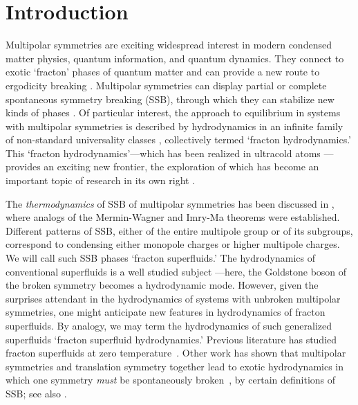 %	
%	



\section{Introduction}

Multipolar symmetries are exciting widespread interest in modern condensed matter physics, quantum information, and quantum dynamics. They connect to exotic `fracton' phases of quantum matter \cite{Pretko2017Subdimensional, Gromov2019Multipole} and can provide a new route to ergodicity breaking \cite{Pai2019Localization, Khemani2020Localization, Sala2020Fragmentation}. Multipolar symmetries can display partial or complete spontaneous symmetry breaking (SSB), through which they can stabilize new kinds of phases \cite{Lake2022Dipolar}. Of particular interest, the approach to equilibrium in systems with multipolar symmetries is described by hydrodynamics in an infinite family of non-standard universality classes \cite{NandkishoreHermele2019, Iaconis2019Subdiffusion}, collectively termed `fracton hydrodynamics.' This `fracton hydrodynamics'---which has been realized in ultracold atoms \cite{GuardadoSanchez2020}---provides an exciting new frontier, the exploration of which has become an important topic of research in its own right \cite{Glorioso2022Breakdown, RichterPal2022, Iaconis2021Multipole, Glorioso2021Nonabelian, Grosvenor2021Hydrodynamics, Osborne2021FractonFluids, Feldmeier2020Anomalous, Sala2022Modulated, Hart2022Quasiconservation, Qi2023FractonMHD, Guo2022Fracton, Glorioso2023Goldstone}. 

The {\it thermodynamics} of SSB of multipolar symmetries has been discussed in \cite{Stahl2022Spontaneous, Kapustin2022Hohenberg}, where analogs of the Mermin-Wagner and Imry-Ma theorems were established. Different patterns of SSB, either of the entire multipole group or of its subgroups, correspond to condensing either monopole charges or higher multipole charges. We will call such SSB phases `fracton superfluids.'
The hydrodynamics of conventional superfluids is a well studied subject \cite{Putterman1974SF}---here, the Goldstone boson of the broken symmetry becomes a hydrodynamic mode. However, given the surprises attendant in the  hydrodynamics of systems with unbroken multipolar symmetries, one might anticipate new features in hydrodynamics of fracton superfluids. By analogy, we may term the hydrodynamics of such generalized superfluids `fracton superfluid hydrodynamics.' Previous literature has studied fracton superfluids at zero temperature~\cite{Yuan2020Fractonic, Lake2022Dipolar}. 
Other work has shown that multipolar symmetries and translation symmetry together lead to exotic hydrodynamics in which one symmetry \emph{must} be spontaneously broken~\cite{Glorioso2023Goldstone}, by certain definitions of SSB; see also \cite{Jensen2022Large}. 

